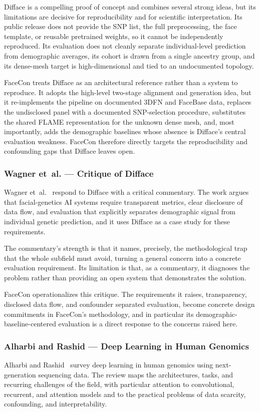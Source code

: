 Difface is a compelling proof of concept and combines several strong ideas, but its limitations are decisive for reproducibility and for scientific interpretation. Its public release does not provide the SNP list, the full preprocessing, the face template, or reusable pretrained weights, so it cannot be independently reproduced. Its evaluation does not cleanly separate individual-level prediction from demographic averages, its cohort is drawn from a single ancestry group, and its dense-mesh target is high-dimensional and tied to an undocumented topology.

FaceCon treats Difface as an architectural reference rather than a system to reproduce. It adopts the high-level two-stage alignment and generation idea, but it re-implements the pipeline on documented 3DFN and FaceBase data, replaces the undisclosed panel with a documented SNP-selection procedure, substitutes the shared FLAME representation for the unknown dense mesh, and, most importantly, adds the demographic baselines whose absence is Difface's central evaluation weakness. FaceCon therefore directly targets the reproducibility and confounding gaps that Difface leaves open.

\subsubsection{Wagner et~al. --- Critique of Difface}
Wagner et~al.~\cite{ref:comment} respond to Difface with a critical commentary. The work argues that facial-genetics AI systems require transparent metrics, clear disclosure of data flow, and evaluation that explicitly separates demographic signal from individual genetic prediction, and it uses Difface as a case study for these requirements.

The commentary's strength is that it names, precisely, the methodological trap that the whole subfield must avoid, turning a general concern into a concrete evaluation requirement. Its limitation is that, as a commentary, it diagnoses the problem rather than providing an open system that demonstrates the solution.

FaceCon operationalizes this critique. The requirements it raises, transparency, disclosed data flow, and confounder separated evaluation, become concrete design commitments in FaceCon's methodology, and in particular its demographic-baseline-centered evaluation is a direct response to the concerns raised here.

\subsubsection{Alharbi and Rashid --- Deep Learning in Human Genomics}
Alharbi and Rashid~\cite{ref:alharbi} survey deep learning in human genomics using next-generation sequencing data. The review maps the architectures, tasks, and recurring challenges of the field, with particular attention to convolutional, recurrent, and attention models and to the practical problems of data scarcity, confounding, and interpretability.

